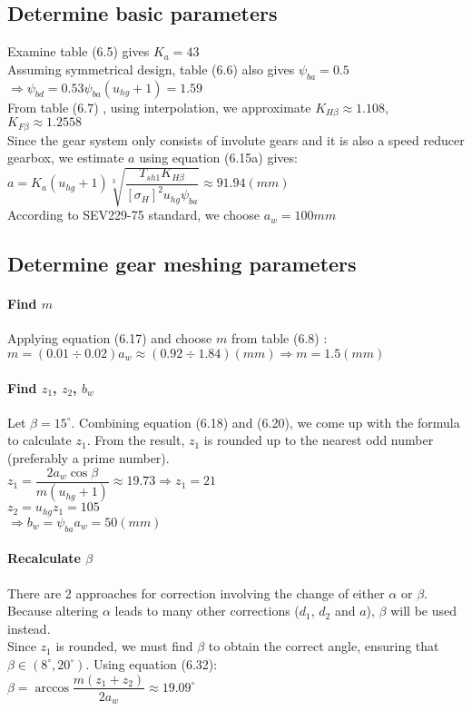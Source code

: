 \subsection{Determine basic parameters}
Examine table (6.5)  gives $ K_a = 43 $\\
Assuming symmetrical design, table (6.6)  also gives $ \psi_{ba} = 0.5$\\
$ \Rightarrow \psi_{bd} = 0.53\psi_{ba}(u_{hg}+1) = 1.59$\\
From table (6.7) , using interpolation, we approximate $ K_{H\beta} \approx 1.108 $, $ K_{F\beta} \approx 1.2558 $\\
Since the gear system only consists of involute gears and it is also a speed reducer gearbox, we estimate $ a $ using equation (6.15a) gives:\\
$ a = K_a(u_{hg}+1)\sqrt[3]{\dfrac{T_{sh1}K_{H\beta}}{[\sigma_H]^2u_{hg}\psi_{ba}}} \approx 91.94 \unit{(mm)}$\\
According to SEV229-75 standard, we choose $ a_w = 100 \unit{mm}$

\subsection{Determine gear meshing parameters}

\paragraph{Find $ m $} Applying equation (6.17)  and choose $ m $ from table (6.8) :\\
$ m = (0.01\div0.02)a_w \approx (0.92\div1.84) \unit{(mm)} \Rightarrow m=1.5\unit{(mm)}$

\paragraph{Find $ z_1 $, $ z_2 $, $ b_w $} Let $ \beta = 15^\circ $. Combining equation (6.18) and (6.20), we come up with the formula to calculate $ z_1 $. From the result, $ z_1 $ is rounded up to the nearest odd number (preferably a prime number).\\
$ z_1 = \dfrac{2a_w\cos\beta}{m(u_{hg}+1)} \approx 19.73 \Rightarrow z_1 = 21$\\
$ z_2 = u_{hg}z_1 = 105 $\\
$ \Rightarrow b_w = \psi_{ba}a_w = 50\unit{(mm)}$ 

\paragraph{Recalculate $ \beta $} There are 2 approaches for correction involving the change of either $ \alpha $ or $ \beta $. Because altering $ \alpha $ leads to many other corrections ($ d_1 $, $ d_2 $ and $ a $), $ \beta $ will be used instead.\\
Since $ z_1 $ is rounded, we must find $ \beta $ to obtain the correct angle, ensuring that $ \beta \in (8^\circ, 20^\circ) $. Using equation (6.32):\\
$ \beta = \arccos\dfrac{m(z_1+z_2)}{2a_w} \approx 19.09^\circ$

